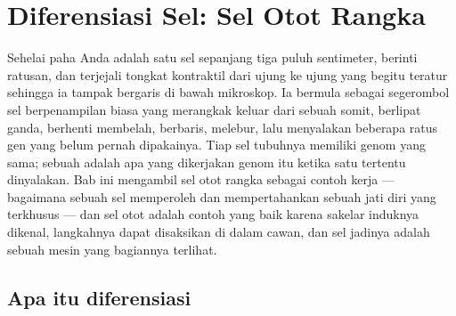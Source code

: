 \chapter{Diferensiasi Sel: Sel Otot Rangka}\label{ch:b2:cell-differentiation}

Sehelai  paha Anda adalah satu sel sepanjang tiga puluh
sentimeter, berinti ratusan, dan terjejali tongkat kontraktil dari ujung
ke ujung yang begitu teratur sehingga ia tampak bergaris di bawah
mikroskop. Ia bermula sebagai segerombol sel berpenampilan biasa yang
merangkak keluar dari sebuah somit, berlipat ganda, berhenti membelah,
berbaris, melebur, lalu menyalakan beberapa ratus gen yang belum pernah
dipakainya. Tiap sel tubuhnya memiliki genom yang sama; sebuah  adalah apa yang dikerjakan genom itu ketika satu  tertentu dinyalakan. Bab ini mengambil sel otot rangka
sebagai contoh kerja \emph{} --- bagaimana sebuah sel
memperoleh dan mempertahankan sebuah jati diri yang terkhusus --- dan
sel otot adalah contoh yang baik karena sakelar induknya dikenal,
langkahnya dapat disaksikan di dalam cawan, dan sel jadinya adalah
sebuah mesin yang bagiannya terlihat.

\section{Apa itu diferensiasi}

